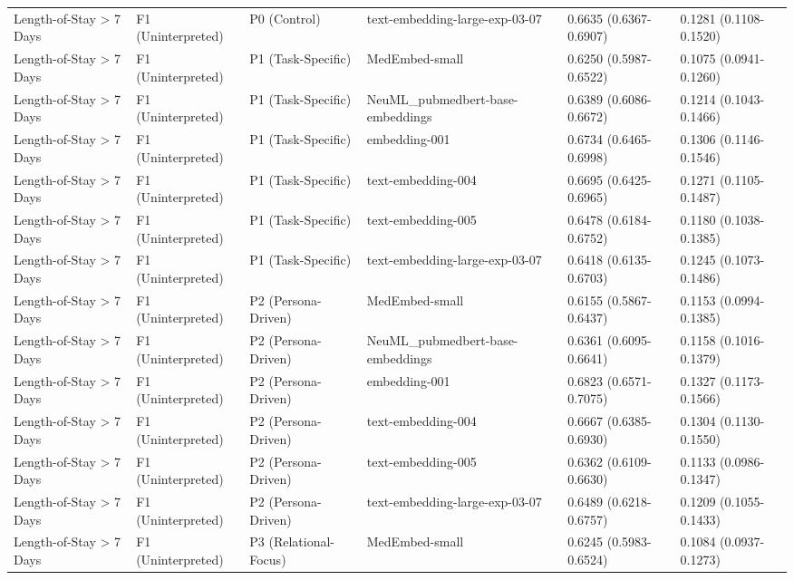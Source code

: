 \documentclass[border=0pt]{standalone}
\begin{document}
\begin{adjustbox}{width=\textwidth}
\begin{tabular}{llllll}
Length-of-Stay \textgreater{} 7 Days & F1 (Uninterpreted) & P0 (Control) & text-embedding-large-exp-03-07 & 0.6635 (0.6367-0.6907) & 0.1281 (0.1108-0.1520) \\
Length-of-Stay \textgreater{} 7 Days & F1 (Uninterpreted) & P1 (Task-Specific) & MedEmbed-small & 0.6250 (0.5987-0.6522) & 0.1075 (0.0941-0.1260) \\
Length-of-Stay \textgreater{} 7 Days & F1 (Uninterpreted) & P1 (Task-Specific) & NeuML\_pubmedbert-base-embeddings & 0.6389 (0.6086-0.6672) & 0.1214 (0.1043-0.1466) \\
Length-of-Stay \textgreater{} 7 Days & F1 (Uninterpreted) & P1 (Task-Specific) & embedding-001 & 0.6734 (0.6465-0.6998) & 0.1306 (0.1146-0.1546) \\
Length-of-Stay \textgreater{} 7 Days & F1 (Uninterpreted) & P1 (Task-Specific) & text-embedding-004 & 0.6695 (0.6425-0.6965) & 0.1271 (0.1105-0.1487) \\
Length-of-Stay \textgreater{} 7 Days & F1 (Uninterpreted) & P1 (Task-Specific) & text-embedding-005 & 0.6478 (0.6184-0.6752) & 0.1180 (0.1038-0.1385) \\
Length-of-Stay \textgreater{} 7 Days & F1 (Uninterpreted) & P1 (Task-Specific) & text-embedding-large-exp-03-07 & 0.6418 (0.6135-0.6703) & 0.1245 (0.1073-0.1486) \\
Length-of-Stay \textgreater{} 7 Days & F1 (Uninterpreted) & P2 (Persona-Driven) & MedEmbed-small & 0.6155 (0.5867-0.6437) & 0.1153 (0.0994-0.1385) \\
Length-of-Stay \textgreater{} 7 Days & F1 (Uninterpreted) & P2 (Persona-Driven) & NeuML\_pubmedbert-base-embeddings & 0.6361 (0.6095-0.6641) & 0.1158 (0.1016-0.1379) \\
Length-of-Stay \textgreater{} 7 Days & F1 (Uninterpreted) & P2 (Persona-Driven) & embedding-001 & 0.6823 (0.6571-0.7075) & 0.1327 (0.1173-0.1566) \\
Length-of-Stay \textgreater{} 7 Days & F1 (Uninterpreted) & P2 (Persona-Driven) & text-embedding-004 & 0.6667 (0.6385-0.6930) & 0.1304 (0.1130-0.1550) \\
Length-of-Stay \textgreater{} 7 Days & F1 (Uninterpreted) & P2 (Persona-Driven) & text-embedding-005 & 0.6362 (0.6109-0.6630) & 0.1133 (0.0986-0.1347) \\
Length-of-Stay \textgreater{} 7 Days & F1 (Uninterpreted) & P2 (Persona-Driven) & text-embedding-large-exp-03-07 & 0.6489 (0.6218-0.6757) & 0.1209 (0.1055-0.1433) \\
Length-of-Stay \textgreater{} 7 Days & F1 (Uninterpreted) & P3 (Relational-Focus) & MedEmbed-small & 0.6245 (0.5983-0.6524) & 0.1084 (0.0937-0.1273) \\

\end{tabular}
\end{adjustbox}
\end{document}
